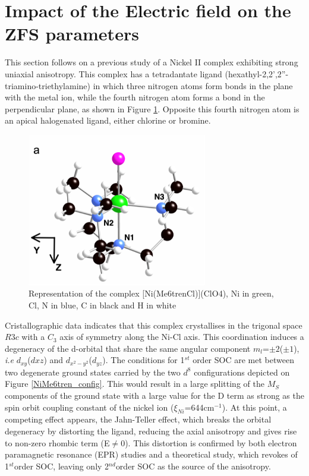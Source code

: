 \documentclass[10pt]{report}
\numberwithin{equation}{section}
\begin{document}
\newpage


\newpage

\section{Impact of the Electric field on the ZFS parameters}

This section follows on a previous study of a Nickel II complex exhibiting strong uniaxial anisotropy.
This complex has a tetradantate ligand (hexathyl-2,2',2''-triamino-triethylamine) in which three nitrogen atoms form bonds in the plane with the metal ion, while the fourth nitrogen atom forms a bond in the perpendicular plane, as shown in Figure \ref{NiMe6tren}.
Opposite this fourth nitrogen atom is an apical halogenated ligand, either chlorine or bromine.

\begin{figure}[!ht]
    \centering
    \includegraphics[width=0.7\textwidth]{Images/NiMe6trenTalal.png}
    \caption{Representation of the complex [Ni(Me6trenCl)](ClO4), Ni in green, Cl, N in blue, C in black and H in white}
    \label{NiMe6tren}
\end{figure}

Cristallographic data indicates that this complex crystallises in the trigonal space $R3c$ with a $C_3$ axis of symmetry along the Ni-Cl axis.
This coordination induces a degeneracy of the d-orbital that share the same angular component $m_l$=$\pm2$($\pm1$), \textit{i.e} $d_{xy}$($d{xz}$) and $d_{x^2-y^2}$($d_{yz}$). 
The conditions for 1$^{st}$ order SOC are met between two degenerate ground states carried by the two $d^8$ configurations depicted on Figure \ref{NiMe6tren_config}.
This would result in a large splitting of the $M_S$ components of the ground state with a large value for the D term as strong as the spin orbit coupling constant of the nickel ion ($\xi_{Ni}$=644cm$^{-1}$).
At this point, a competing effect appears, the Jahn-Teller effect, which breaks the orbital degeneracy by distorting the ligand, reducing the axial anisotropy and gives rise to non-zero rhombic term (E$\neq$0).
This distortion is confirmed by both electron paramagnetic resonance (EPR) studies and a theoretical study, which revokes of 1$^{st}$order SOC, leaving only 2$^{nd}$order SOC as the source of the anisotropy.
\end{document}
